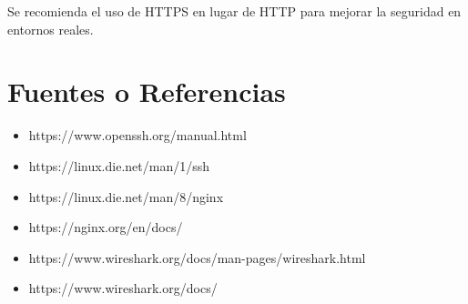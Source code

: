 \documentclass[12pt]{article}
\begin{document}
Se recomienda el uso de HTTPS en lugar de HTTP para mejorar la seguridad en entornos reales.

\newpage

\section{Fuentes o Referencias}

\begin{itemize}
\item https://www.openssh.org/manual.html
\item https://linux.die.net/man/1/ssh
\item https://linux.die.net/man/8/nginx
\item https://nginx.org/en/docs/
\item https://www.wireshark.org/docs/man-pages/wireshark.html 
\item https://www.wireshark.org/docs/
\end{itemize}
\end{document}
